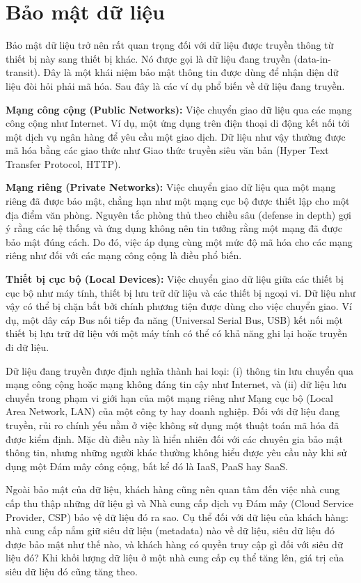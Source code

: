 \section{Bảo mật dữ liệu}

Bảo mật dữ liệu trở nên rất quan trọng đối với dữ liệu được truyền thông từ thiết bị này sang thiết bị khác. Nó được gọi là dữ liệu đang truyền (data-in-transit). Đây là một khái niệm bảo mật thông tin được dùng để nhận diện dữ liệu đòi hỏi phải mã hóa. Sau đây là các ví dụ phổ biến về dữ liệu đang truyền.

\textbf{Mạng công cộng (Public Networks):} Việc chuyển giao dữ liệu qua các mạng công cộng như Internet. Ví dụ, một ứng dụng trên điện thoại di động kết nối tới một dịch vụ ngân hàng để yêu cầu một giao dịch. Dữ liệu như vậy thường được mã hóa bằng các giao thức như Giao thức truyền siêu văn bản (Hyper Text Transfer Protocol, HTTP).

\textbf{Mạng riêng (Private Networks):} Việc chuyển giao dữ liệu qua một mạng riêng đã được bảo mật, chẳng hạn như một mạng cục bộ được thiết lập cho một địa điểm văn phòng. Nguyên tắc phòng thủ theo chiều sâu (defense in depth) gợi ý rằng các hệ thống và ứng dụng không nên tin tưởng rằng một mạng đã được bảo mật đúng cách. Do đó, việc áp dụng cùng một mức độ mã hóa cho các mạng riêng như đối với các mạng công cộng là điều phổ biến.

\textbf{Thiết bị cục bộ (Local Devices):} Việc chuyển giao dữ liệu giữa các thiết bị cục bộ như máy tính, thiết bị lưu trữ dữ liệu và các thiết bị ngoại vi. Dữ liệu như vậy có thể bị chặn bắt bởi chính phương tiện được dùng cho việc chuyển giao. Ví dụ, một dây cáp Bus nối tiếp đa năng (Universal Serial Bus, USB) kết nối một thiết bị lưu trữ dữ liệu với một máy tính có thể có khả năng ghi lại hoặc truyền đi dữ liệu.

Dữ liệu đang truyền được định nghĩa thành hai loại: (i) thông tin lưu chuyển qua mạng công cộng hoặc mạng không đáng tin cậy như Internet, và (ii) dữ liệu lưu chuyển trong phạm vi giới hạn của một mạng riêng như Mạng cục bộ (Local Area Network, LAN) của một công ty hay doanh nghiệp. Đối với dữ liệu đang truyền, rủi ro chính yếu nằm ở việc không sử dụng một thuật toán mã hóa đã được kiểm định. Mặc dù điều này là hiển nhiên đối với các chuyên gia bảo mật thông tin, nhưng những người khác thường không hiểu được yêu cầu này khi sử dụng một Đám mây công cộng, bất kể đó là IaaS, PaaS hay SaaS.

Ngoài bảo mật của dữ liệu, khách hàng cũng nên quan tâm đến việc nhà cung cấp thu thập những dữ liệu gì và Nhà cung cấp dịch vụ Đám mây (Cloud Service Provider, CSP) bảo vệ dữ liệu đó ra sao. Cụ thể đối với dữ liệu của khách hàng: nhà cung cấp nắm giữ siêu dữ liệu (metadata) nào về dữ liệu, siêu dữ liệu đó được bảo mật như thế nào, và khách hàng có quyền truy cập gì đối với siêu dữ liệu đó? Khi khối lượng dữ liệu ở một nhà cung cấp cụ thể tăng lên, giá trị của siêu dữ liệu đó cũng tăng theo.

